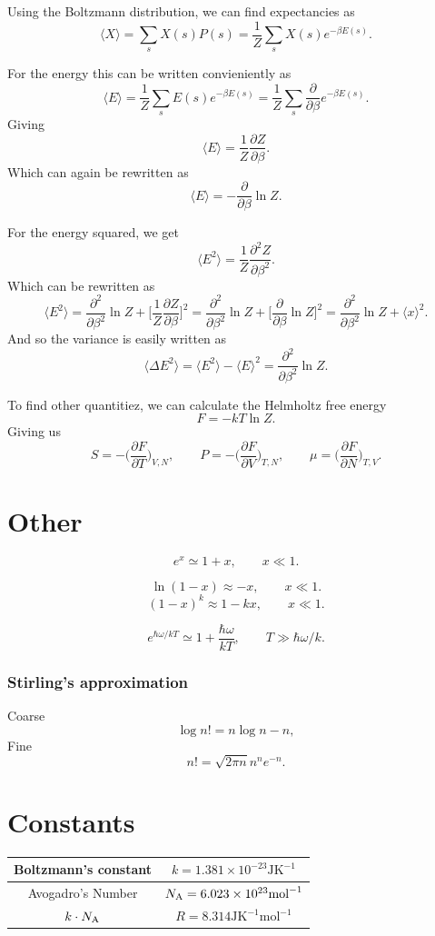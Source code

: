 \documentclass[a4paper, 11pt, notitlepage, english]{article}
\newcommand{\p}{\partial}
\begin{document}
Using the Boltzmann distribution, we can find expectancies as
$$\langle X \rangle = \sum_s X(s) P(s) = \frac{1}{Z} \sum_s X(s) e^{-\beta E(s)}.$$

For the energy this can be written convieniently as
$$\langle E \rangle = \frac{1}{Z}\sum_s E(s) e^{-\beta E(s)} = \frac{1}{Z} \sum_s \frac{\p}{\p \beta} e^{-\beta E(s)}.$$
Giving
$$\langle E \rangle = \frac{1}{Z}\frac{\p Z}{\p \beta}. $$
Which can again be rewritten as
$$\langle E \rangle = - \frac{\p }{\p \beta} \ln Z. $$

For the energy squared, we get
$$\langle E^2 \rangle = \frac{1}{Z}\frac{\p^2 Z}{\p \beta^2}.$$
Which can be rewritten as
$$\langle E^2 \rangle = \frac{\p^2}{\p \beta^2} \ln Z + \bigg[\frac{1}{Z} \frac{\p Z}{\p \beta}\bigg]^2 = \frac{\p^2}{\p \beta^2} \ln Z + \bigg[\frac{\p }{\p \beta}\ln Z \bigg]^2 = \frac{\p^2}{\p \beta^2} \ln Z  + \langle x \rangle^2.$$
And so the variance is easily written as
$$\langle \Delta E^2 \rangle = \langle E^2 \rangle - \langle E \rangle^2 = \frac{\p^2}{\p \beta^2} \ln Z.$$


To find other quantitiez, we can calculate the Helmholtz free energy
$$F = -kT \ln Z.$$
Giving us
$$S = -\bigg(\frac{\p F}{\p T}\bigg)_{V, N}, \qquad P = -\bigg(\frac{\p F}{\p V}\bigg)_{T, N}, \qquad \mu = \bigg(\frac{\p F}{\p N}\bigg)_{T, V}.$$

\clearpage

\section*{Other}
$$e^x \simeq 1 + x, \qquad x \ll 1.$$

$$\ln(1-x) \approx -x, \qquad x \ll 1.$$
$$(1-x)^k \approx 1-kx, \qquad x \ll 1.$$


$$e^{\hbar\omega/kT} \simeq 1 + \frac{\hbar \omega}{kT}, \qquad T \gg \hbar\omega/k.$$

\subsubsection*{Stirling's approximation}
Coarse
$$\log n! = n \log n - n,$$
Fine
$$n! = \sqrt{2\pi n} n^n e^{-n}.$$

\section*{Constants}

\begin{center}
\begin{tabular}{|c|c|}	
\hline
Boltzmann's constant & $k = 1.381\times10^{-23} \mbox{JK}^{-1}$ \\ \hline 
Avogadro's Number & $N_{\rm A} = 6.023\times10^{23} \mbox{mol}^{-1}$ \\ \hline 
$k\cdot N_{\rm A}$ & $R = 8.314 \mbox{JK}^{-1}\mbox{mol}^{-1}$ \\ \hline
\end{tabular}
\end{center}
\end{document}
